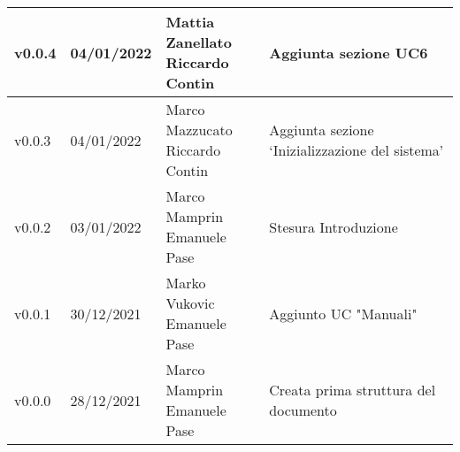 \begin{center}
\begin{tabular}{|p{2cm}|p{2cm}|p{4cm}|p{5cm}|}
    v0.0.4            & 04/01/2022    & \aCapo{Mattia Zanellato\\Riccardo Contin}  & Aggiunta sezione UC6                            \\ \hline
    v0.0.3            & 04/01/2022    & \aCapo{Marco Mazzucato\\Riccardo Contin}   & Aggiunta sezione `Inizializzazione del sistema' \\ \hline
    v0.0.2            & 03/01/2022    & \aCapo{Marco Mamprin\\Emanuele Pase}       & Stesura Introduzione                            \\ \hline
    v0.0.1            & 30/12/2021    & \aCapo{Marko Vukovic\\Emanuele Pase}       & Aggiunto UC "Manuali"                           \\ \hline
    v0.0.0            & 28/12/2021    & \aCapo{Marco Mamprin\\Emanuele Pase}       & Creata prima struttura del documento            \\ \hline

  \end{tabular}
\end{center}
